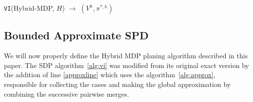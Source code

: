 \incmargin{.5em}
\linesnumbered
\begin{algorithm}[th!]
\vspace{-.5mm}
\dontprintsemicolon
{}
\caption{\footnotesize \texttt{VI}(Hybrid-MDP, $H$) $\longrightarrow$ $(V^h,\pi^{*,h})$ \label{alg:vi}}
\vspace{-1mm}
\end{algorithm}
\decmargin{.5em}


\subsection{Bounded Approximate SPD}
We will now properly define the Hybrid MDP planing algorithm described in this paper. The SDP algorithm~\ref{alg:vi} was modified from its original exact version by the addition of line \ref{approxline} which uses the algorithm~\ref{alg:approx}, responsible for collecting the cases and making the global approximation by combining the successive pairwise merges.

